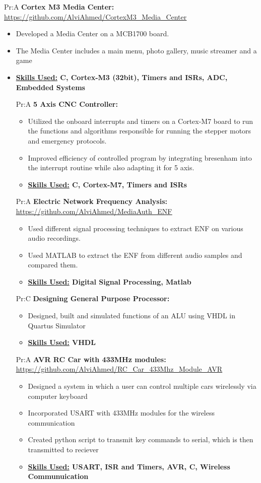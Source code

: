 Pr:A
\textbf{Cortex M3 Media Center: } 
\underline{\url{https://github.com/AlviAhmed/CortexM3_Media_Center}}
\begin{itemize}[noitemsep,nolistsep]
\item Developed a Media Center on a MCB1700 board.
\item The Media Center includes a main menu, photo gallery, music streamer and a game 
\item \textbf{ \underline{Skills Used:} C, Cortex-M3 (32bit), Timers and ISRs, ADC,
    Embedded Systems}

  
Pr:A
\textbf{5 Axis CNC Controller: } 
\begin{itemize}[noitemsep,nolistsep]
\item Utilized the onboard interrupts and timers on a Cortex-M7 board to run the functions and algorithms responsible for running the stepper motors and emergency protocols.
\item Improved efficiency of controlled program by integrating bresenham into the interrupt routine while also adapting it for 5 axis.
\item \textbf{ \underline{Skills Used:} C, Cortex-M7, Timers and ISRs}
\end{itemize}


Pr:A
\textbf{Electric Network Frequency Analysis: }
\underline{\url{https://github.com/AlviAhmed/MediaAuth_ENF}}
\begin{itemize}[noitemsep,nolistsep]
\item Used different signal processing techniques to extract ENF on various audio recordings.
\item Used MATLAB to extract the ENF from different audio samples and compared them.
\item \textbf{\underline{Skills Used:} Digital Signal Processing, Matlab}
\end{itemize}




Pr:C
\textbf{Designing General Purpose Processor: } 
\begin{itemize}[noitemsep,nolistsep]
\item Designed, built and simulated functions of an ALU using VHDL in Quartus Simulator
\item \textbf{ \underline{Skills Used:} VHDL}
\end{itemize}


Pr:A
\textbf{AVR RC Car with 433MHz modules: }
\underline{\url{https://github.com/AlviAhmed/RC_Car_433Mhz_Module_AVR}}
\begin{itemize}[noitemsep,nolistsep]
\item Designed a system in which a user can control multiple cars wirelessly
  via computer keyboard
\item Incorporated USART with 433MHz modules for the wireless communication
\item Created python script to transmit key commands to serial, which is then transmitted to reciever
\item \textbf{\underline{Skills Used:} USART, ISR and Timers, AVR, C, Wireless Communuication }
\end{itemize}
\vspace{1em}



\end{itemize}
